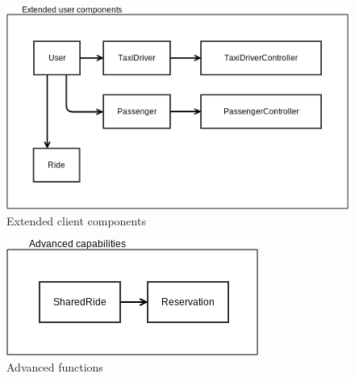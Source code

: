 \begin{figure} [h]
  \vspace{3mm}
  \includegraphics[scale=0.68]{diagrams/point 5.png}
  \caption{\label{fig:ext_client_comp} Extended client components}
\end{figure}
\begin{figure} [h]
  \centering
  \includegraphics[scale=0.72]{diagrams/point 7.png}
  \caption{\label{fig:adv_func} Advanced functions}
\end{figure}


